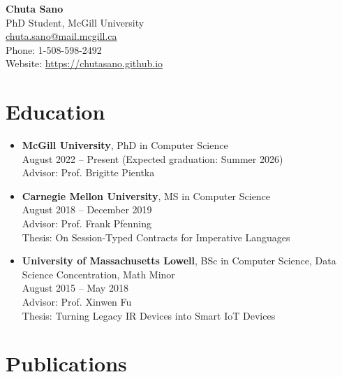 \documentclass[11pt]{article}
\begin{document}
\begin{center}
    {\LARGE \textbf{Chuta Sano}} \\
    PhD Student, McGill University \\
    \href{mailto:chuta.sano@mail.mcgill.ca}{chuta.sano@mail.mcgill.ca} \\
    Phone: 1-508-598-2492 \\
    Website: \href{https://chutasano.github.io}{https://chutasano.github.io}
\end{center}

\section*{Education}
\begin{itemize}[leftmargin=*]
    \item \textbf{McGill University}, PhD in Computer Science \\
    August 2022 – Present (Expected graduation: Summer 2026) \\
    Advisor: Prof. Brigitte Pientka
    \item \textbf{Carnegie Mellon University}, MS in Computer Science \\
    August 2018 – December 2019 \\
    Advisor: Prof. Frank Pfenning \\
    Thesis: On Session-Typed Contracts for Imperative Languages
    \item \textbf{University of Massachusetts Lowell}, BSc in Computer Science, Data Science Concentration, Math Minor \\
    August 2015 – May 2018 \\
    Advisor: Prof. Xinwen Fu \\
    Thesis: Turning Legacy IR Devices into Smart IoT Devices
\end{itemize}

\section*{Publications}
\printbibliography[heading=none, nottype=software, notcategory=arxiv]
\end{document}
